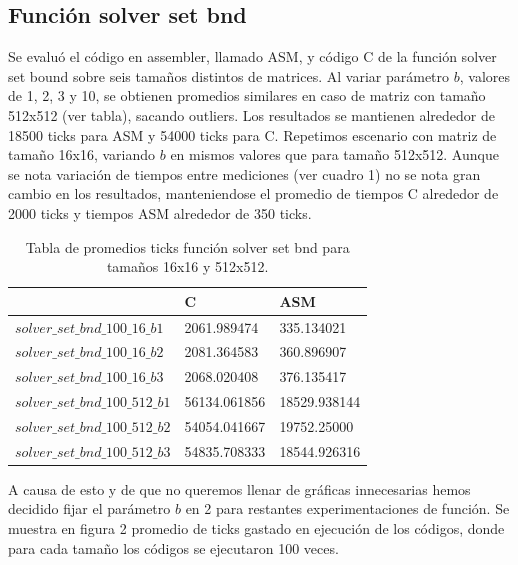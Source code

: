  

 
\subsection{Función solver set bnd}
 
Se evaluó el código en assembler, llamado ASM, y código C de la función solver set bound sobre seis tamaños distintos de matrices. Al variar parámetro $b$, valores de 1, 2, 3 y 10, se obtienen promedios similares en caso de matriz con tamaño 512x512 (ver tabla), sacando outliers. Los resultados se mantienen alrededor de 18500 ticks para ASM y 54000 ticks para C. 
Repetimos escenario con matriz de tamaño 16x16, variando $b$ en mismos valores que para tamaño 512x512. Aunque se nota 
variación de tiempos entre mediciones (ver cuadro 1) no se nota gran cambio en los resultados, manteniendose el promedio de tiempos C alrededor de 2000 ticks y tiempos ASM alrededor de 350 ticks.\newline
\begin{table}[htbp]
\begin{center}
\begin{tabular}{|l|l|l|}
\hline
  & C & ASM\\
\hline \hline
$solver\_set\_bnd\_100\_16\_b1$ & 2061.989474 & 335.134021\\ \hline
$solver\_set\_bnd\_100\_16\_b2$  & 2081.364583 & 360.896907\\ \hline
$solver\_set\_bnd\_100\_16\_b3$  & 2068.020408 & 376.135417 \\ 
\hline \hline
$solver\_set\_bnd\_100\_512\_b1$  & 56134.061856 & 18529.938144 \\ \hline

$solver\_set\_bnd\_100\_512\_b2$  & 54054.041667 & 19752.25000 \\ \hline

$solver\_set\_bnd\_100\_512\_b3$  &  54835.708333 & 18544.926316 \\ \hline

\end{tabular}
\caption{Tabla de promedios ticks función solver set bnd para tamaños 16x16 y 512x512.}
\end{center}
\end{table}
A causa de esto y de que no queremos llenar de gráficas innecesarias hemos decidido fijar el parámetro $b$ en 2 para restantes experimentaciones de función. 
Se muestra en figura 2 promedio de ticks gastado en ejecución de los códigos, donde para cada tamaño los códigos se ejecutaron 100 veces.
